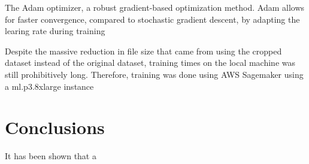 \documentclass{article}
\begin{document}
The Adam optimizer, a robust gradient-based optimization method. Adam allows for faster convergence, compared to stochastic gradient descent, by adapting the learing rate during training \cite{kingma2017adam}

Despite the massive reduction in file size that came from using the cropped dataset instead of the original dataset, training times on the local machine was still prohibitively long. Therefore, training was done using AWS Sagemaker using a ml.p3.8xlarge instance 


\section{Conclusions}

It has been shown that a 



\end{document}
